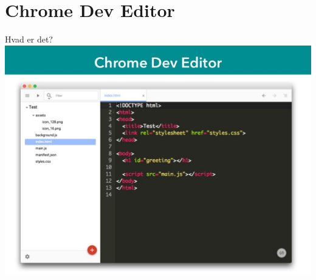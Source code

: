 \documentclass[10pt]{beamer}
\begin{document}
\section{Chrome Dev Editor}


\begin{frame}{Hvad er det?}
		\includegraphics[width=\linewidth]{img/chromedeveditor.jpg}
\end{frame}

\end{document}
